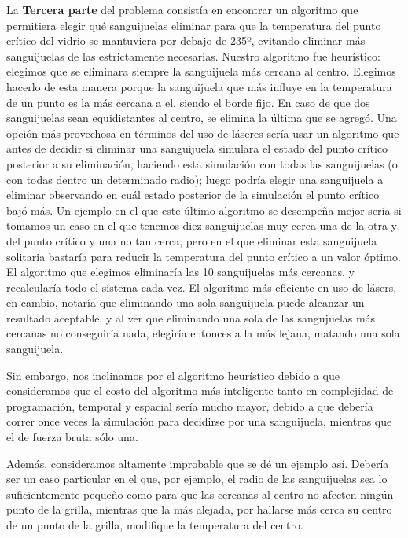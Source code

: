 \documentclass[spanish,a4paper]{article}
\begin{document}
La \textbf{Tercera parte} del problema consistía en encontrar un algoritmo que permitiera elegir qué sanguijuelas eliminar para que la temperatura del punto crítico del vidrio se mantuviera por debajo de 235º, evitando eliminar más sanguijuelas de las estrictamente necesarias. Nuestro algoritmo fue heurístico: elegimos que se eliminara siempre la sanguijuela más cercana al centro. Elegimos hacerlo de esta manera porque la sanguijuela que más influye en la temperatura de un punto es la más cercana a el, siendo el borde fijo. En caso de que dos sanguijuelas sean equidistantes al centro, se elimina la última que se agregó.\newline
Una opción más provechosa en términos del uso de láseres sería usar un algoritmo que antes de decidir si eliminar una sanguijuela simulara el estado del punto crítico posterior a su eliminación, haciendo esta simulación con todas las sanguijuelas (o con todas dentro un determinado radio); luego podría elegir una sanguijuela a eliminar observando en cuál estado posterior de la simulación el punto crítico bajó más.
Un ejemplo en el que este último algoritmo se desempeña mejor sería si tomamos un caso en el que tenemos diez sanguijuelas muy cerca una de la otra y del punto crítico y una no tan cerca, pero en el que eliminar esta sanguijuela solitaria bastaría para reducir la temperatura del punto crítico a un valor óptimo.
El algoritmo que elegimos eliminaría las 10 sanguijuelas más cercanas, y recalcularía todo el sistema cada vez.
El algoritmo más eficiente en uso de lásers, en cambio, notaría que eliminando una sola sanguijuela puede alcanzar un resultado aceptable, y al ver que eliminando una sola de las sangujuelas más cercanas no conseguiría nada, elegiría entonces a la más lejana, matando una sola sanguijuela.

Sin embargo, nos inclinamos por el algoritmo heurístico debido a que consideramos que el costo del algoritmo más inteligente tanto en complejidad de programación, temporal y espacial sería mucho mayor, debido a que debería correr once veces la simulación para decidirse por una sanguijuela, mientras que el de fuerza bruta sólo una. 

Además, consideramos altamente improbable que se dé un ejemplo así. Debería ser un caso particular en el que, por ejemplo, el radio de las sanguijuelas sea lo suficientemente pequeño como para que las cercanas al centro no afecten ningún punto de la grilla, mientras que la más alejada, por hallarse más cerca su centro de un punto de la grilla, modifique la temperatura del centro.
\end{document}
